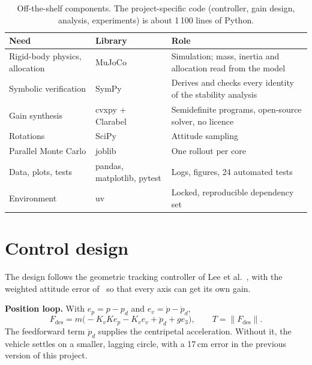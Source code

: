 \documentclass[10pt,a4paper]{scrartcl}
\newcommand{\RuleSection}[1]{%
    \section{#1}%
    \vspace{0.2em}{\color{accent!35}\hrule height 0.4pt}\vspace{0.3em}%
  }
\begin{document}
  \begin{table}[h]
  \small
  \centering
  \renewcommand{\arraystretch}{1.1}
  \begin{tabularx}{\textwidth}{@{}L{4.2cm} L{3.4cm} X@{}}
  \toprule
  \textbf{Need} & \textbf{Library} & \textbf{Role} \\[.15cm]
  \midrule
  Rigid-body physics, allocation & MuJoCo & Simulation; mass, inertia and allocation read from the model \\[.15cm]
  Symbolic verification & SymPy & Derives and checks every identity of the stability analysis \\[.15cm]
  Gain synthesis & cvxpy + Clarabel~\citep{diamond2016cvxpy} & Semidefinite programs, open-source solver, no licence \\[.15cm]
  Rotations & SciPy & Attitude sampling \\[.15cm]
  Parallel Monte Carlo & joblib & One rollout per core \\[.15cm]
  Data, plots, tests & pandas, matplotlib, pytest & Logs, figures, 24 automated tests \\[.15cm]
  Environment & uv & Locked, reproducible dependency set \\[.15cm]
  \bottomrule
  \end{tabularx}
  \caption{Off-the-shelf components. The project-specific code (controller, gain design, analysis, experiments) is about 1\,100 lines of Python.}
  \label{tab:stack}
  \end{table}

  \RuleSection{Control design}
  \label{sec:control}

  The design follows the geometric tracking controller of Lee et
  al.~\citep{lee2010geometric}, with the weighted attitude error of~\citep{lee2012exponential}
  so that every axis can get its own gain.

  \textbf{Position loop.} With $e_p = p - p_d$ and $e_v = \dot p - \dot p_d$,
  \begin{equation}
    F_{\mathrm{des}} = m\bigl(-K_v K e_p - K_v e_v + \ddot p_d + g e_3\bigr), \qquad T = \|F_{\mathrm{des}}\|.
  \end{equation}
  The feedforward term $\ddot p_d$ supplies the centripetal acceleration. Without it, the vehicle
  settles on a smaller, lagging circle, with a 17\,cm error in the previous version of this project.
\end{document}
